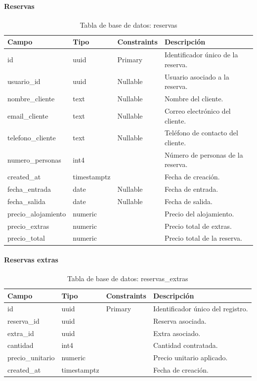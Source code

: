 \documentclass[11pt,a4paper]{article}
\begin{document}
\paragraph{Reservas}
\begin{table}[H]
\centering
\small
\begin{tabularx}{\textwidth}{|p{2.5cm}|p{2.2cm}|p{3.2cm}|X|}
\hline
\textbf{Campo} & \textbf{Tipo} & \textbf{Constraints} & \textbf{Descripción} \\
\hline
id & uuid & Primary & Identificador único de la reserva. \\
\hline
usuario\_id & uuid & Nullable & Usuario asociado a la reserva. \\
\hline
nombre\_cliente & text & Nullable & Nombre del cliente. \\
\hline
email\_cliente & text & Nullable & Correo electrónico del cliente. \\
\hline
telefono\_cliente & text & Nullable & Teléfono de contacto del cliente. \\
\hline
numero\_personas & int4 &  & Número de personas de la reserva. \\
\hline
created\_at & timestamptz &  & Fecha de creación. \\
\hline
fecha\_entrada & date & Nullable & Fecha de entrada. \\
\hline
fecha\_salida & date & Nullable & Fecha de salida. \\
\hline
precio\_alojamiento & numeric &  & Precio del alojamiento. \\
\hline
precio\_extras & numeric &  & Precio total de extras. \\
\hline
precio\_total & numeric &  & Precio total de la reserva. \\
\hline
\end{tabularx}
\caption{Tabla de base de datos: reservas}
\end{table}

\paragraph{Reservas extras}
\begin{table}[H]
\centering
\small
\begin{tabularx}{\textwidth}{|p{2.5cm}|p{2.2cm}|p{3.2cm}|X|}
\hline
\textbf{Campo} & \textbf{Tipo} & \textbf{Constraints} & \textbf{Descripción} \\
\hline
id & uuid & Primary & Identificador único del registro. \\
\hline
reserva\_id & uuid &  & Reserva asociada. \\
\hline
extra\_id & uuid &  & Extra asociado. \\
\hline
cantidad & int4 &  & Cantidad contratada. \\
\hline
precio\_unitario & numeric &  & Precio unitario aplicado. \\
\hline
created\_at & timestamptz &  & Fecha de creación. \\
\hline
\end{tabularx}
\caption{Tabla de base de datos: reservas\_extras}
\end{table}
\end{document}
